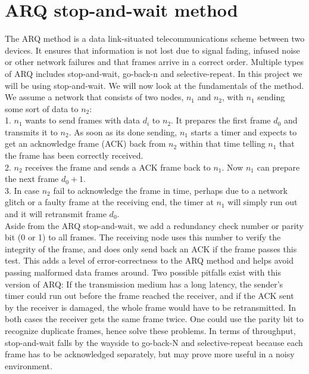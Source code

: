 \section{ARQ stop-and-wait method}\label{th:arq}

The ARQ method is a data link-situated telecommunications scheme between two devices. It ensures that information is not lost due to signal fading, infused noise or other network failures and that frames arrive in a correct order. Multiple types of ARQ includes stop-and-wait, go-back-n and selective-repeat. In this project we will be using stop-and-wait. We will now look at the fundamentals of the method. We assume a network that consists of two nodes, $n_1$ and $n_2$, with $n_1$ sending some sort of data to $n_2$: \newline \\
1. $n_1$ wants to send frames with data $d_i$ to $n_2$. It prepares the first frame $d_0$ and transmits it to $n_2$. As soon as its done sending, $n_1$ starts a timer and expects to get an acknowledge frame (ACK) back from $n_2$ within that time telling $n_1$ that the frame has been correctly received. \newline \\
2. $n_2$ receives the frame and sends a ACK frame back to $n_1$. Now $n_1$ can prepare the next frame $d_0+1$. \newline \\
3. In case $n_2$ fail to acknowledge the frame in time, perhaps due to a network glitch or a faulty frame at the receiving end, the timer at $n_1$ will simply run out and it will retransmit frame $d_0$. \newline \\
\noindent Aside from the ARQ stop-and-wait, we add a redundancy check number or parity bit (0 or 1) to all frames. The receiving node uses this number to verify the integrity of the frame, and does only send back an ACK if the frame passes this test. This adds a level of error-correctness to the ARQ method and helps avoid passing malformed data frames around. Two possible pitfalls exist with this version of ARQ: If the transmission medium has a long latency, the sender's timer could run out before the frame reached the receiver, and if the ACK sent by the receiver is damaged, the whole frame would have to be retransmitted. In both cases the receiver gets the same frame twice. One could use the parity bit to recognize duplicate frames, hence solve these problems. In terms of throughput, stop-and-wait falls by the wayside to go-back-N and selective-repeat because each frame has to be acknowledged separately, but may prove more useful in a noisy environment.
